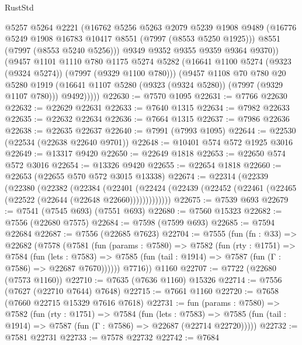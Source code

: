 \begin{lexlean}{RustStd}
\begin{coremodule}
              @5257
              @5264
              @2221
              (@16762
                @5256
                @5263
                @2079
                @5239
                @1908
                @9489
                (@16776 @5249 @1908 @16783 @10417 @8551 (@7997 (@8553 @5250 @1925)))
                @8551
                (@7997 (@8553 @5240 @5256)))
              @9349
              @9352
              @9355
              @9359
              @9364
              @9370))
          (@9457
            @1101
            @1110
            @780
            @1175
            @5274
            @5282
            (@16641 @1100 @5274 (@9323 (@9324 @5274)) (@7997 (@9329 @1100 @780)))
            (@9457
              @1108
              @70
              @780
              @20
              @5280
              @1919
              (@16641 @1107 @5280 (@9323 (@9324 @5280)) (@7997 (@9329 @1107 @780)))
              @9492)))))
@22630 := @7570 @1095
@22631 := @7766 @22630
@22632 := @22629 @22631
@22633 := @7640 @1315
@22634 := @7982 @22633
@22635 := @22632 @22634
@22636 := @7664 @1315
@22637 := @7986 @22636
@22638 := @22635 @22637
@22640 := @7991 (@7993 @1095)
@22644 := @22530 (@22534 (@22638 @22640 @9701))
@22648 := @10401 @574 @572 @1925 @3016
@22649 := @13317 @9420
@22650 := @22649 @1818
@22653 := @22650 @574 @572 @3016
@22654 := @13326 @9420
@22655 := @22654 @1818
@22660 := @22653 (@22655 @570 @572 @3015 @13338)
@22674 := @22314
    (@22339
      (@22380
        (@22382
          (@22384
            (@22401
              (@22424 (@22439 (@22452 (@22461 (@22465 (@22522 (@22644 (@22648 @22660)))))))))))))
@22675 := @7539 @693
@22679 := @7541 (@7545 @693) (@7551 @693)
@22680 := @7560 @15323
@22682 := @7556 (@22680 @7575)
@22684 := @7598 (@7599 @693)
@22685 := @7594 @22684
@22687 := @7556 (@22685 @7623)
@22704 := @7555
    (fun (fn : @33) =>
    @22682
      (@7578
        (@7581
          (fun (params : @7580) =>
          @7582
            (fun (rty : @1751) =>
            @7584
              (fun (lets : @7583) =>
              @7585 (fun (tail : @1914) => @7587 (fun (Γ : @7586) => @22687 @7670))))))
        @7716))
    @1160
@22707 := @7722 (@22680 (@7573 @1160))
@22710 := @7635 (@7636 @1160) @15326
@22714 := @7556 (@7627 (@22710 @7644) @7648)
@22715 := @7661 @1160
@22720 := @7658 (@7660 @22715 @15329 @7616 @7618)
@22731 := fun (params : @7580) =>
  @7582
    (fun (rty : @1751) =>
    @7584
      (fun (lets : @7583) =>
      @7585 (fun (tail : @1914) => @7587 (fun (Γ : @7586) => @22687 (@22714 @22720)))))
@22732 := @7581 @22731
@22733 := @7578 @22732
@22742 := @7684

\end{coremodule}
\end{lexlean}
